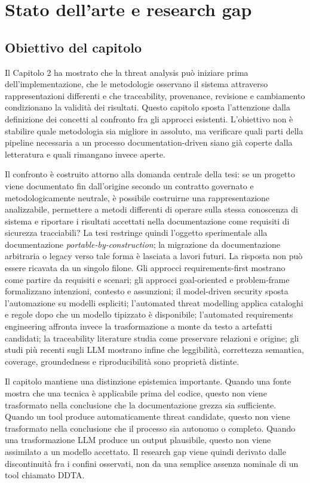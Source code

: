 \documentclass[12pt,a4paper,oneside]{report}
\begin{document}
\chapter{Stato dell'arte e research gap}

\section*{Obiettivo del capitolo}

Il Capitolo 2 ha mostrato che la threat analysis può iniziare prima dell'implementazione, che le metodologie osservano il sistema attraverso rappresentazioni differenti e che traceability, provenance, revisione e cambiamento condizionano la validità dei risultati. Questo capitolo sposta l'attenzione dalla definizione dei concetti al confronto fra gli approcci esistenti. L'obiettivo non è stabilire quale metodologia sia migliore in assoluto, ma verificare quali parti della pipeline necessaria a un processo documentation-driven siano già coperte dalla letteratura e quali rimangano invece aperte.

Il confronto è costruito attorno alla domanda centrale della tesi: se un progetto viene documentato fin dall'origine secondo un contratto governato e metodologicamente neutrale, è possibile costruirne una rappresentazione analizzabile, permettere a metodi differenti di operare sulla stessa conoscenza di sistema e riportare i risultati accettati nella documentazione come requisiti di sicurezza tracciabili? La tesi restringe quindi l'oggetto sperimentale alla documentazione \emph{portable-by-construction}; la migrazione da documentazione arbitraria o legacy verso tale forma è lasciata a lavori futuri. La risposta non può essere ricavata da un singolo filone. Gli approcci requirements-first mostrano come partire da requisiti e scenari; gli approcci goal-oriented e problem-frame formalizzano intenzioni, contesto e assunzioni; il model-driven security sposta l'automazione su modelli espliciti; l'automated threat modelling applica cataloghi e regole dopo che un modello tipizzato è disponibile; l'automated requirements engineering affronta invece la trasformazione a monte da testo a artefatti candidati; la traceability literature studia come preservare relazioni e origine; gli studi più recenti sugli LLM mostrano infine che leggibilità, correttezza semantica, coverage, groundedness e riproducibilità sono proprietà distinte.

Il capitolo mantiene una distinzione epistemica importante. Quando una fonte mostra che una tecnica è applicabile prima del codice, questo non viene trasformato nella conclusione che la documentazione grezza sia sufficiente. Quando un tool produce automaticamente threat candidate, questo non viene trasformato nella conclusione che il processo sia autonomo o completo. Quando una trasformazione LLM produce un output plausibile, questo non viene assimilato a un modello accettato. Il research gap viene quindi derivato dalle discontinuità fra i confini osservati, non da una semplice assenza nominale di un tool chiamato DDTA.
\end{document}
